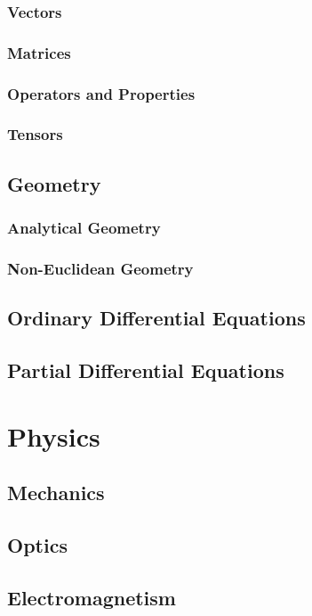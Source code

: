 \subsection{Vectors}
\subsection{Matrices}
\subsection{Operators and Properties}
\subsection{Tensors}


\section{Geometry}
\subsection{Analytical Geometry}
\subsection{Non-Euclidean Geometry}

\section{Ordinary Differential Equations}
\section{Partial Differential Equations}

\chapter{Physics}

\section{Mechanics}
\section{Optics}
\section{Electromagnetism}
